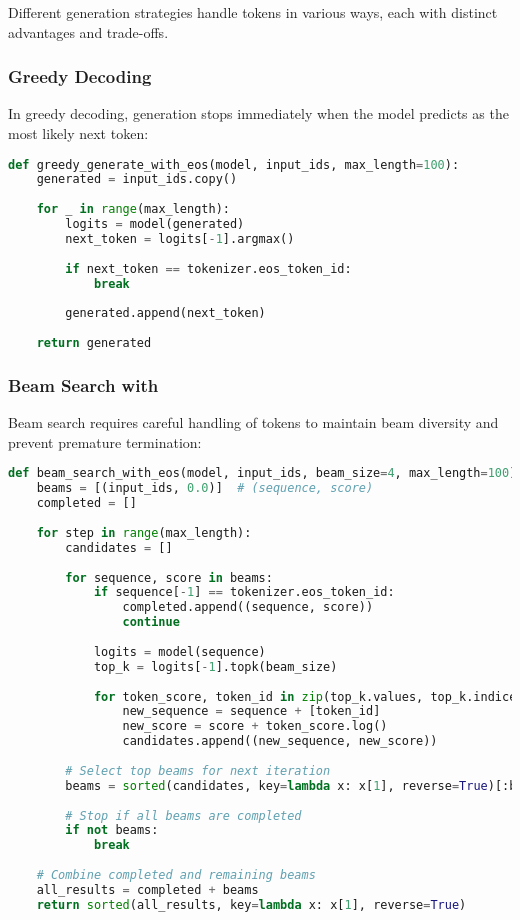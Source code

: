 Different generation strategies handle \eos{} tokens in various ways, each with distinct advantages and trade-offs.

\subsubsection{Greedy Decoding}

In greedy decoding, generation stops immediately when the model predicts \eos{} as the most likely next token:

\begin{lstlisting}[language=Python, caption=Greedy generation with \eos{} stopping]
def greedy_generate_with_eos(model, input_ids, max_length=100):
    generated = input_ids.copy()
    
    for _ in range(max_length):
        logits = model(generated)
        next_token = logits[-1].argmax()
        
        if next_token == tokenizer.eos_token_id:
            break
            
        generated.append(next_token)
    
    return generated
\end{lstlisting}

\subsubsection{Beam Search with \eos{}}

Beam search requires careful handling of \eos{} tokens to maintain beam diversity and prevent premature termination:

\begin{lstlisting}[language=Python, caption=Beam search with \eos{} handling]
def beam_search_with_eos(model, input_ids, beam_size=4, max_length=100):
    beams = [(input_ids, 0.0)]  # (sequence, score)
    completed = []
    
    for step in range(max_length):
        candidates = []
        
        for sequence, score in beams:
            if sequence[-1] == tokenizer.eos_token_id:
                completed.append((sequence, score))
                continue
                
            logits = model(sequence)
            top_k = logits[-1].topk(beam_size)
            
            for token_score, token_id in zip(top_k.values, top_k.indices):
                new_sequence = sequence + [token_id]
                new_score = score + token_score.log()
                candidates.append((new_sequence, new_score))
        
        # Select top beams for next iteration
        beams = sorted(candidates, key=lambda x: x[1], reverse=True)[:beam_size]
        
        # Stop if all beams are completed
        if not beams:
            break
    
    # Combine completed and remaining beams
    all_results = completed + beams
    return sorted(all_results, key=lambda x: x[1], reverse=True)
\end{lstlisting}

